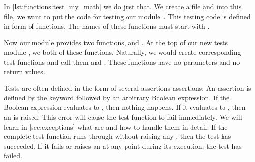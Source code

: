 %
%
%
%
%

In \cref{lst:functions:test_my_math} we do just that.
We create a file  and into this file, we want to put the code for testing our module~.
This testing code is defined in form of functions.
The names of these functions must start with .

Now our module  provides two functions,  and .
At the top of our new tests module , we  both of these functions.
Naturally, we would create corresponding test functions and call them  and .
These functions have no parameters and no return values.

Tests are often defined in the form of several assertions assertions:%
%
%
%
An assertion is defined by the keyword  followed by an arbitrary Boolean expression.
If the Boolean expression evaluates to , then nothing happens.
If it evaluates to , then an  is raised.
This error will cause the test function to fail immediately.
We will learn in \cref{sec:exceptions} what  are and how to handle them in detail.
If the complete test function runs through without raising any , then the test has succeeded.
If it fails or raises an  at any point during its execution, the test has failed.

